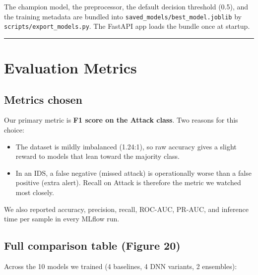 The champion model, the preprocessor, the default decision threshold
(0.5), and the training metadata are bundled into
\texttt{saved\_models/best\_model.joblib} by
\texttt{scripts/export\_models.py}. The FastAPI app loads the bundle
once at startup.

\begin{center}\rule{0.5\linewidth}{0.5pt}\end{center}

\section{Evaluation Metrics}\label{evaluation-metrics}

\subsection{Metrics chosen}\label{metrics-chosen}

Our primary metric is \textbf{F1 score on the Attack class}. Two reasons
for this choice:

\begin{itemize}
\tightlist
\item
  The dataset is mildly imbalanced (1.24:1), so raw accuracy gives a
  slight reward to models that lean toward the majority class.
\item
  In an IDS, a false negative (missed attack) is operationally worse
  than a false positive (extra alert). Recall on Attack is therefore the
  metric we watched most closely.
\end{itemize}

We also reported accuracy, precision, recall, ROC-AUC, PR-AUC, and
inference time per sample in every MLflow run.

\subsection{Full comparison table (Figure
20)}\label{full-comparison-table-figure-20}

Across the 10 models we trained (4 baselines, 4 DNN variants, 2
ensembles):

